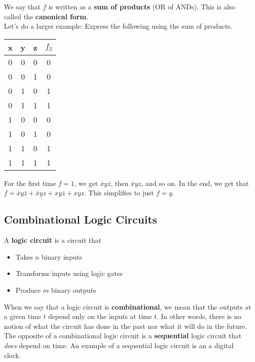 \documentclass[]{article}
\begin{document}
We say that $f$ is written as a \textbf{sum of products} (OR of ANDs). This is also called the \textbf{canonical form}.\\

Let's do a larger example: Express the following using the sum of products. 

\begin{center}
	\begin{tabular}{|c|c|c||c|}
		x & y & z & $f_3$ \\\hline
		0 & 0 & 0 & 0\\
		0 & 0 & 1 & 0\\
		0 & 1 & 0 & 1\\
		0 & 1 & 1 & 1\\
		1 & 0 & 0 & 0\\
		1 & 0 & 1 & 0\\
		1 & 1 & 0 & 1\\
		1 & 1 & 1 & 1\\
	\end{tabular}
	\bigbreak
\end{center}

For the first time $f=1$, we get $\bar{x}y\bar{z}$, then $\bar{x}yz$, and so on. In the end, we get that $f = \bar{x}y\bar{z} + \bar{x}yz + xy\bar{z} + xyz$. This simplifies to just $f=y$. \\


\subsection{Combinational Logic Circuits}

A \textbf{logic circuit} is a circuit that 

\begin{itemize}
	\item Takes $n$ binary inputs
	\item Transforms inputs using logic gates
	\item Produce $m$ binary outputs
\end{itemize}\bigbreak

When we say that a logic circuit is \textbf{combinational}, we mean that the outputs at a given time $t$ depend only on the inputs at time $t$. In other words, there is no notion of what the circuit has done in the past nor what it will do in the future.\\

The opposite of a combinational logic circuit is a \textbf{sequential} logic circuit that \textit{does} depend on time. An example of a sequential logic circuit is an a digital clock.\\
\end{document}
